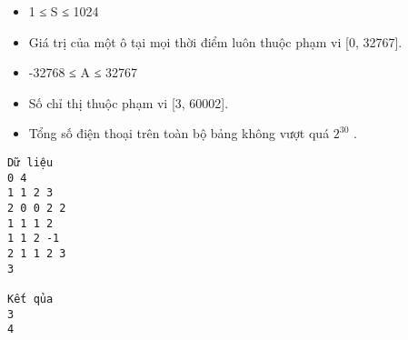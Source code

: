 \begin{itemize}
	\item 1 ≤ S ≤ 1024
	\item Giá trị của một ô tại mọi thời điểm luôn thuộc phạm vi [0, 32767].
	\item -32768 ≤ A ≤ 32767
	\item Số chỉ thị thuộc phạm vi [3, 60002].
	\item Tổng số điện thoại trên toàn bộ bảng không vượt quá $2^{30}$ .
\end{itemize}
\begin{verbatim}
Dữ liệu
0 4  		
1 1 2 3  		
2 0 0 2 2
1 1 1 2
1 1 2 -1
2 1 1 2 3
3

Kết qủa
3
4
\end{verbatim}
